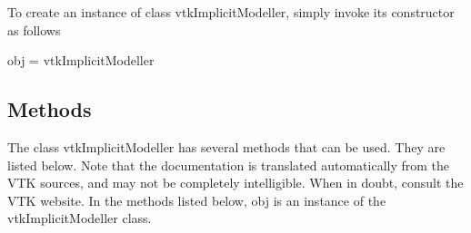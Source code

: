 To create an instance of class vtk\-Implicit\-Modeller, simply invoke its constructor as follows \begin{DoxyVerb}  obj = vtkImplicitModeller
\end{DoxyVerb}
 \hypertarget{vtkwidgets_vtkxyplotwidget_Methods}{}\subsection{Methods}\label{vtkwidgets_vtkxyplotwidget_Methods}
The class vtk\-Implicit\-Modeller has several methods that can be used. They are listed below. Note that the documentation is translated automatically from the V\-T\-K sources, and may not be completely intelligible. When in doubt, consult the V\-T\-K website. In the methods listed below, {\ttfamily obj} is an instance of the vtk\-Implicit\-Modeller class. 
